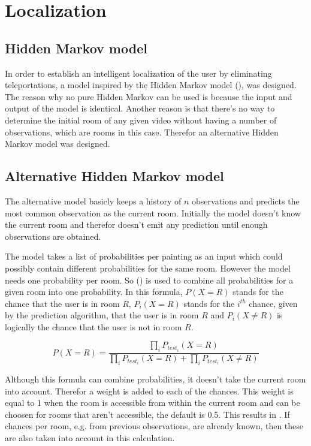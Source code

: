 \section{Localization}
\label{sec:localization}

\subsection{Hidden Markov model}
\label{subsec:hidden-markov}

In order to establish an intelligent localization of the user by eliminating teleportations, a model inspired by the Hidden Markov model (\cite{eddy1996hidden}), was designed. The reason why no pure Hidden Markov can be used is because the input and output of the model is identical. Another reason is that there's no way to determine the initial room of any given video without having a number of observations, which are rooms in this case. Therefor an alternative Hidden Markov model was designed. \cite{jurafsky2014speech}

\subsection{Alternative Hidden Markov model}
\label{subsec:alternative-hidden-markov}

The alternative model basicly keeps a history of $n$ observations and predicts the most common observation as the current room. Initially the model doesn't know the current room and therefor doesn't emit any prediction until enough observations are obtained.

The model takes a list of probabilities per painting as an input which could possibly contain different probabilities for the same room. However the model needs one probability per room. So  (\cite{genest1986combining}) is used to combine all probabilities for a given room into one probability. In this formula, $P(X = R)$ stands for the chance that the user is in room $R$, $P_{i}(X = R)$ stands for the $i^{th}$ chance, given by the prediction algorithm, that the user is in room $R$ and $P_{i}(X \ne R)$ is logically the chance that the user is not in room $R$.

\begin{equation}
    \label{eq:combine-chances}
    P(X = R) = \frac{\prod_{i} P_{test_i}(X = R)}{\prod_{i} P_{test_i}(X = R) + \prod_{i} P_{test_i}(X \ne R)}
\end{equation}

Although this formula can combine probabilities, it doesn't take the current room into account. Therefor a weight is added to each of the chances. This weight is equal to 1 when the room is accessible from within the current room and can be choosen for rooms that aren't accessible, the default is 0.5. This results in . If chances per room, e.g. from previous observations, are already known, then these are also taken into account in this calculation.


